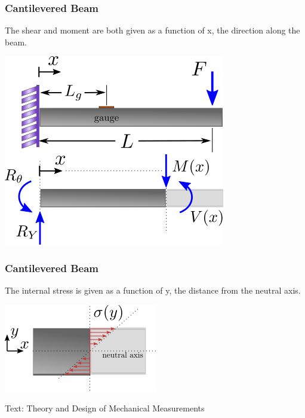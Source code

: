\documentclass[fleqn]{beamer} %
\newcommand{\sectionIsubsectionIIItitle}{Cantilevered Beam}
\begin{document}
			\begin{frame} 
				\frametitle{\sectionIsubsectionIIItitle}
				The shear and moment are both given as a function of x, the direction along the beam. 

				\begin{multicols}{2}

				\includegraphics[scale=.5]{images/cantelever_beam.png}

				\vspcc

				\end{multicols}
			
				\bigskip
							
			\end{frame}	

			\begin{frame} 
				\frametitle{\sectionIsubsectionIIItitle}
				The internal stress is given as a function of y, the distance from the neutral axis. \vspccc

				\begin{multicols}{2}

				\includegraphics[scale=.75]{images/internal_stress.png}

				\scalebox{1}{$\sigma=\frac{Mc}{I}$}\vspc

				\end{multicols}

				\vspace{20mm}
				{\tiny Text: Theory and Design of Mechanical Measurements}
							
				\bigskip
			

				
			\end{frame}	
\end{document}
